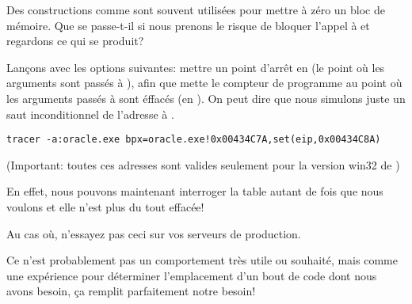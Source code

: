 Des constructions comme  sont souvent utilisées pour
mettre à zéro un bloc de mémoire.
Que se passe-t-il si nous prenons le risque de bloquer l'appel à 
et regardons ce qui se produit?


Lançons \tracer avec les options suivantes: mettre un point d'arrêt en 
(le point où les arguments sont passés à ), afin que \tracer mette le compteur de programme  au point
où les arguments passés à  sont éffacés (en ).
On peut dire que nous simulons juste un saut inconditionnel de l'adresse  à .

\begin{lstlisting}
tracer -a:oracle.exe bpx=oracle.exe!0x00434C7A,set(eip,0x00434C8A)
\end{lstlisting}

(Important: toutes ces adresses sont valides seulement pour la version win32 de )

En effet, nous pouvons maintenant interroger la table  autant de fois
que nous voulons et elle n'est plus du tout effacée!

Au cas où, n'essayez pas ceci sur vos serveurs de production.

Ce n'est probablement pas un comportement très utile ou souhaité, mais comme une
expérience pour déterminer l'emplacement d'un bout de code dont nous avons besoin,
ça remplit parfaitement notre besoin!

